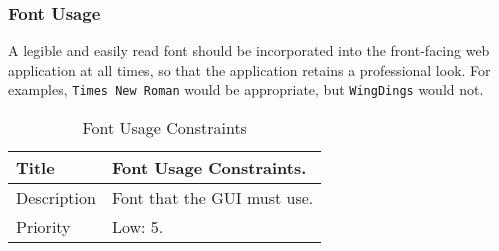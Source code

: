 \subsubsection{Font Usage}
  A legible and easily read font should be incorporated into the front-facing
  web application at all times, so that the application retains a professional
  look. For examples, \texttt{Times New Roman} would be appropriate, but
  \texttt{WingDings} would not.

  \begin{table}[h!]
    \caption{Font Usage Constraints}
    \label{system-constraints/miscellaneous/font-usage-table}
    \begin{tabularx}{\textwidth}{|l|X|}
      \hline
      Title       & Font Usage Constraints. \\ \hline
      Description & Font that the GUI must use. \\ \hline
      Priority    & Low: 5. \\ \hline
    \end{tabularx}
  \end{table}
